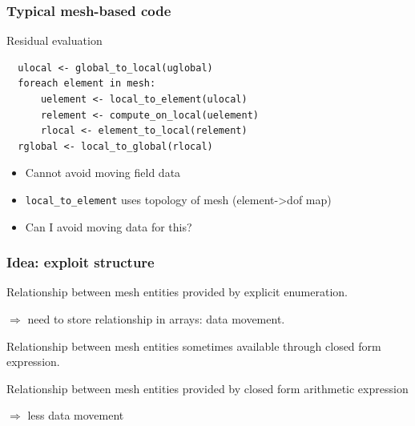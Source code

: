 \documentclass[presentation,aspectratio=43, 10pt]{beamer}
\begin{document}
\begin{frame}[fragile]
  \frametitle{Typical mesh-based code}
  \begin{block}{Residual evaluation}
\begin{verbatim}
  ulocal <- global_to_local(uglobal)
  foreach element in mesh:
      uelement <- local_to_element(ulocal)
      relement <- compute_on_local(uelement)
      rlocal <- element_to_local(relement)
  rglobal <- local_to_global(rlocal)
\end{verbatim}
  \end{block}
  \begin{itemize}
  \item Cannot avoid moving field data
  \item \verb|local_to_element| uses topology of mesh (element->dof
    map)
  \item Can I avoid moving data for this?
  \end{itemize}
\end{frame}
\begin{frame}
  \frametitle{Idea: exploit structure}
  \begin{definition}
    Relationship between mesh entities provided by explicit
    enumeration.

    $\Rightarrow$ need to store relationship in arrays: data movement.
  \end{definition}
  \begin{definition}
    Relationship between mesh entities sometimes available through
    closed form expression.
  \end{definition}
  \begin{definition}
    Relationship between mesh entities provided by closed form
    arithmetic expression

    $\Rightarrow$ less data movement
  \end{definition}
\end{frame}
\end{document}
